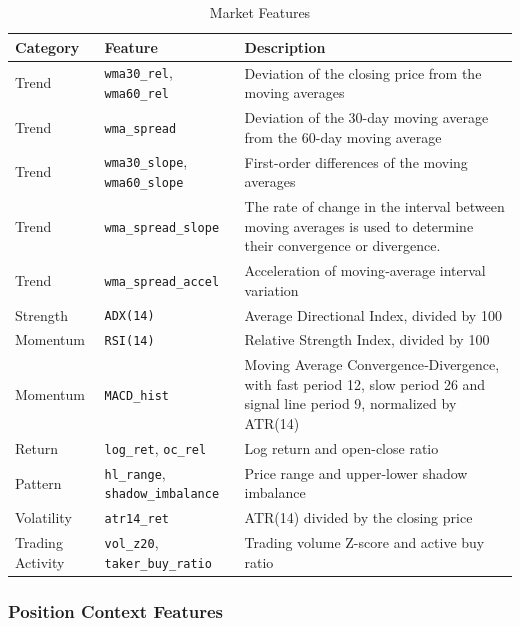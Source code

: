 \documentclass[12pt]{article}
\begin{document}
\begin{table}[H]
\centering
\caption{Market Features}
\label{tab:market_features}
\small
\renewcommand{\arraystretch}{1.2}
\begin{tabular}{p{}p{}p{}}
\toprule
Category & Feature & Description \\
\midrule
Trend &
\texttt{wma30\_rel}, \texttt{wma60\_rel} &
Deviation of the closing price from the moving averages \\
Trend &
\texttt{wma\_spread} &
Deviation of the 30-day moving average from the 60-day moving average \\
Trend &
\texttt{wma30\_slope}, \texttt{wma60\_slope} &
First-order differences of the moving averages \\
Trend &
\texttt{wma\_spread\_slope} &
The rate of change in the interval between moving averages is used 
to determine their convergence or divergence. \\
Trend &
\texttt{wma\_spread\_accel} &
Acceleration of moving‑average interval variation \\
Strength &
\texttt{ADX(14)} &
Average Directional Index, divided by 100 \\
Momentum &
\texttt{RSI(14)} &
Relative Strength Index, divided by 100 \\
Momentum &
\texttt{MACD\_hist} &
Moving Average Convergence‑Divergence, with fast period 12, slow period 26 and signal 
line period 9, normalized by ATR(14)\\
Return &
\texttt{log\_ret}, \texttt{oc\_rel} &
Log return and open-close ratio \\
Pattern &
\texttt{hl\_range}, \texttt{shadow\_imbalance} &
Price range and upper-lower shadow imbalance \\
Volatility &
\texttt{atr14\_ret} &
ATR(14) divided by the closing price \\
Trading Activity &
\texttt{vol\_z20}, \texttt{taker\_buy\_ratio} &
Trading volume Z-score and active buy ratio \\
\bottomrule
\end{tabular}
\end{table}

\subsubsection{Position Context Features}
\end{document}
